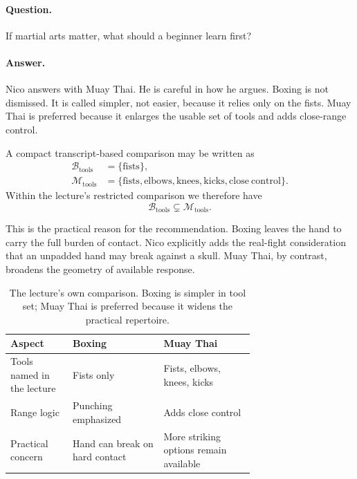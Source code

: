 \paragraph{Question.} If martial arts matter, what should a beginner learn first?

\paragraph{Answer.} Nico answers with Muay Thai. He is careful in how he argues. Boxing is not dismissed. It is called simpler, not easier, because it relies only on the fists. Muay Thai is preferred because it enlarges the usable set of tools and adds close-range control.

A compact transcript-based comparison may be written as
\begin{align}
\mathcal{B}_{\mathrm{tools}} &= \{\mathrm{fists}\},\\
\mathcal{M}_{\mathrm{tools}} &= \{\mathrm{fists},\mathrm{elbows},\mathrm{knees},\mathrm{kicks},\mathrm{close\ control}\}.
\end{align}
Within the lecture's restricted comparison we therefore have
\begin{equation}
\mathcal{B}_{\mathrm{tools}} \subsetneq \mathcal{M}_{\mathrm{tools}}.
\end{equation}

This is the practical reason for the recommendation. Boxing leaves the hand to carry the full burden of contact. Nico explicitly adds the real-fight consideration that an unpadded hand may break against a skull. Muay Thai, by contrast, broadens the geometry of available response.

\begin{table}[h]
\centering
\begin{tabular}{|p{0.16\linewidth}|p{0.27\linewidth}|p{0.27\linewidth}|}
\hline
Aspect & Boxing & Muay Thai \\
\hline
Tools named in the lecture & Fists only & Fists, elbows, knees, kicks \\
\hline
Range logic & Punching emphasized & Adds close control \\
\hline
Practical concern & Hand can break on hard contact & More striking options remain available \\
\hline
\end{tabular}
\caption{The lecture's own comparison. Boxing is simpler in tool set; Muay Thai is preferred because it widens the practical repertoire.}
\end{table}

